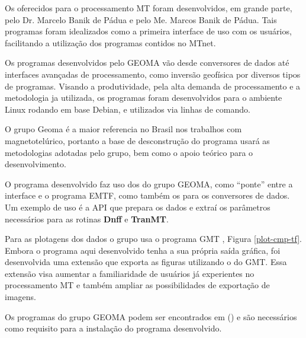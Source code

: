         Os  oferecidos para o processamento MT foram desenvolvidos, em grande parte, pelo Dr. Marcelo Banik de Pádua e pelo Me. Marcos Banik de Pádua. Tais programas foram idealizados como a primeira interface de uso com os usuários, facilitando a utilização dos programas contidos no MTnet. 
        
        Os programas desenvolvidos pelo GEOMA vão desde conversores de dados até interfaces avançadas de processamento, como inversão geofísica por diversos tipos de programas. Visando a produtividade, pela alta demanda de processamento e a metodologia ja utilizada, os programas foram desenvolvidos para o ambiente Linux rodando em base Debian, e utilizados via linhas de comando. 
        
        O grupo Geoma é a maior referencia no Brasil nos trabalhos com magnetotelúrico, portanto a base de desconstrução do programa usará  as metodologias adotadas pelo grupo, bem como o apoio teórico para o desenvolvimento. 
        
        O programa desenvolvido faz uso dos  do grupo GEOMA, como ``ponte'' entre a interface e o programa EMTF, como também os  para os conversores de dados. Um exemplo de uso é a API  que prepara os dados e extraí os parâmetros necessários para as rotinas \textbf{Dnff} e \textbf{TranMT}. 
        
        Para as plotagens dos dados o grupo usa o programa GMT \cite{gmt}, Figura \ref{plot-cmp-tf}. Embora o programa aqui desenvolvido tenha a sua própria saída gráfica, foi desenvolvida uma extensão que exporta as figuras utilizando o  do GMT. Essa extensão visa aumentar a familiaridade de usuários já experientes no processamento MT e também ampliar as possibilidades de exportação de imagens. 
        
        Os programas do grupo GEOMA podem ser encontrados em \citeauthor{gitgeoma} (\citeyear{gitgeoma}) e são necessários como requisito para a instalação do programa desenvolvido.
    
    
        \begin{verbatim}
         
         
         
         
         
         
         
         
         
         
        \end{verbatim}

